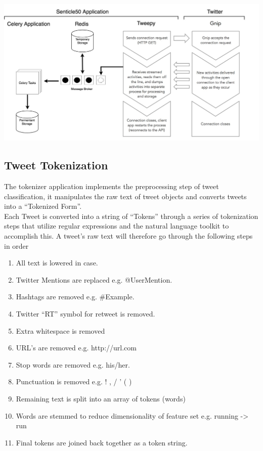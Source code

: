 \documentclass[11pt]{report}
\begin{document}
\begin{center}
  \includegraphics[width=\textwidth]{images/real-time-tweet-collection.jpg}
  \label{fig:syspipe}
\end{center}


\subsection*{Tweet Tokenization}
The tokenizer application implements the preprocessing step of tweet classification, it manipulates the raw text of tweet objects and converts tweets into a ``Tokenized Form''.
\\

Each Tweet is converted into a string of ``Tokens'' through a series of tokenization steps that utilize regular expressions and the natural language toolkit to accomplish this. A tweet's raw text will therefore go through the following steps in order

\begin{enumerate}
\item All text is lowered in case.
\item Twitter Mentions are replaced e.g. @UserMention.
\item Hashtags are removed e.g. \#Example.
\item Twitter ``RT'' symbol for retweet is removed.
\item Extra whitespace is removed
\item URL's are removed e.g. http://url.com
\item Stop words are removed e.g. his/her.
\item Punctuation is removed e.g. ! , / ' ( )
\item Remaining text is split into an array of tokens (words)
\item Words are stemmed to reduce dimensionality of feature set e.g. running -> run
\item Final tokens are joined back together as a token string.
\end{enumerate}
\end{document}
